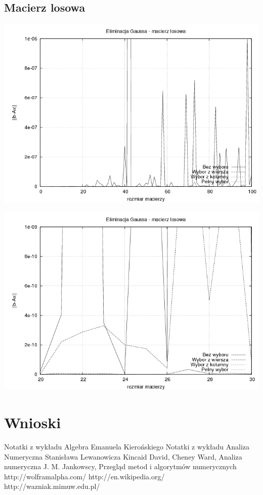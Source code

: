 \documentclass[a4paper,10pt]{article}
\begin{document}
    \subsection{Macierz losowa}
        \begin{center}
            \includegraphics[width=140mm]{random_plot.png}
        \end{center}
        \begin{center}
            \includegraphics[width=140mm]{random_focus_plot.png}
        \end{center}

\section{Wnioski}
	
\begin{thebibliography}{9}
	 Notatki z wykładu Algebra Emanuela Kierońskiego
	 Notatki z wykładu Analiza Numeryczna Stanisława Lewanowicza
	 Kincaid David, Cheney Ward, Analiza numeryczna
	 J. M. Jankowscy, Przegląd metod i algorytmów numerycznych
	 http://wolframalpha.com/
	 http://en.wikipedia.org/
	 http://wazniak.mimuw.edu.pl/
\end{thebibliography}
\end{document}
